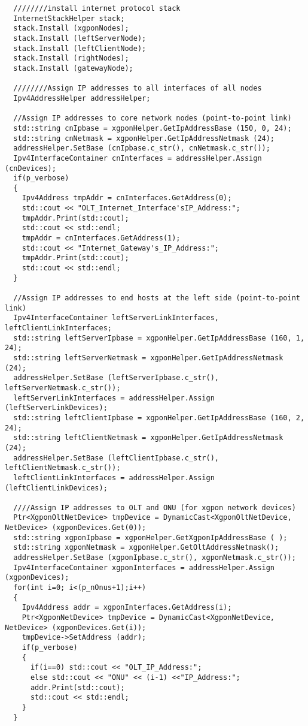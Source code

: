 \begin{lstlisting}
  ////////install internet protocol stack
  InternetStackHelper stack;
  stack.Install (xgponNodes);
  stack.Install (leftServerNode);
  stack.Install (leftClientNode);
  stack.Install (rightNodes);
  stack.Install (gatewayNode);

  ////////Assign IP addresses to all interfaces of all nodes
  Ipv4AddressHelper addressHelper;

  //Assign IP addresses to core network nodes (point-to-point link)
  std::string cnIpbase = xgponHelper.GetIpAddressBase (150, 0, 24);
  std::string cnNetmask = xgponHelper.GetIpAddressNetmask (24);
  addressHelper.SetBase (cnIpbase.c_str(), cnNetmask.c_str());
  Ipv4InterfaceContainer cnInterfaces = addressHelper.Assign (cnDevices);
  if(p_verbose)
  {
    Ipv4Address tmpAddr = cnInterfaces.GetAddress(0);
    std::cout << "OLT_Internet_Interface'sIP_Address:";
    tmpAddr.Print(std::cout);
    std::cout << std::endl;
    tmpAddr = cnInterfaces.GetAddress(1);
    std::cout << "Internet_Gateway's_IP_Address:";
    tmpAddr.Print(std::cout);
    std::cout << std::endl;
  }

  //Assign IP addresses to end hosts at the left side (point-to-point link)
  Ipv4InterfaceContainer leftServerLinkInterfaces, leftClientLinkInterfaces;
  std::string leftServerIpbase = xgponHelper.GetIpAddressBase (160, 1, 24);
  std::string leftServerNetmask = xgponHelper.GetIpAddressNetmask (24);
  addressHelper.SetBase (leftServerIpbase.c_str(), leftServerNetmask.c_str());
  leftServerLinkInterfaces = addressHelper.Assign (leftServerLinkDevices);
  std::string leftClientIpbase = xgponHelper.GetIpAddressBase (160, 2, 24);
  std::string leftClientNetmask = xgponHelper.GetIpAddressNetmask (24);
  addressHelper.SetBase (leftClientIpbase.c_str(), leftClientNetmask.c_str());
  leftClientLinkInterfaces = addressHelper.Assign (leftClientLinkDevices);

  ////Assign IP addresses to OLT and ONU (for xgpon network devices)
  Ptr<XgponOltNetDevice> tmpDevice = DynamicCast<XgponOltNetDevice, NetDevice> (xgponDevices.Get(0));
  std::string xgponIpbase = xgponHelper.GetXgponIpAddressBase ( );
  std::string xgponNetmask = xgponHelper.GetOltAddressNetmask();
  addressHelper.SetBase (xgponIpbase.c_str(), xgponNetmask.c_str());
  Ipv4InterfaceContainer xgponInterfaces = addressHelper.Assign (xgponDevices);
  for(int i=0; i<(p_nOnus+1);i++)
  {
    Ipv4Address addr = xgponInterfaces.GetAddress(i);
    Ptr<XgponNetDevice> tmpDevice = DynamicCast<XgponNetDevice, NetDevice> (xgponDevices.Get(i));
    tmpDevice->SetAddress (addr);
    if(p_verbose)
    {
      if(i==0) std::cout << "OLT_IP_Address:";
      else std::cout << "ONU" << (i-1) <<"IP_Address:";
      addr.Print(std::cout);
      std::cout << std::endl;
    }
  }


\end{lstlisting}
